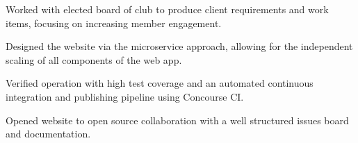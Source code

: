 \begin{cventries}
{\begin{cvitems}
        \item {Worked with elected board of club to produce client requirements and work items, focusing on increasing member engagement.}
        \item {Designed the website via the microservice approach, allowing for the independent scaling of all components of the web app.}
        \item {Verified operation with high test coverage and an automated continuous integration and publishing pipeline using Concourse CI.}
        \item {Opened website to open source collaboration with a well structured issues board and documentation.}
      \end{cvitems}
    }
\end{cventries}
